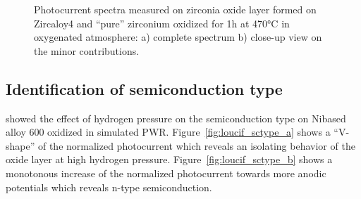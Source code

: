 \begin{figure}[h]
        \caption{Photocurrent spectra measured on zirconia oxide layer formed on 
        Zircaloy4 and “pure” zirconium oxidized for 1h at 470°C in oxygenated 
        atmosphere\citep{benaboud2007}: a) complete spectrum b) close-up view on the minor contributions.}
        \label{fig:benaboud_minor_oxides}
    \end{figure}



\subsection{Identification of semiconduction type}
    \citet{loucif2013} showed the effect of hydrogen pressure on 
    the semiconduction type on Nibased alloy 600 oxidized in simulated PWR. 
    Figure~\ref{fig:loucif_sctype_a} shows a “V-shape” of the normalized photocurrent which 
    reveals an isolating behavior of the oxide layer at high hydrogen pressure. 
    Figure~\ref{fig:loucif_sctype_b} shows a monotonous increase of the 
    normalized photocurrent towards more anodic potentials which reveals 
    n-type semiconduction.

